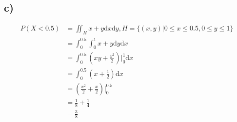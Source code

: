 \documentclass[a4paper, UTF-8]{article}
\theoremstyle{plain}
\begin{document}
\subsection{c)} 

\begin{align*}
P(X < 0.5) &= \iint_{H} x + y \mathrm{d}x \mathrm{d}y, H = \{(x, y) | 0 \leq x \leq 0.5, 0 \leq y \leq 1\}\\
&= \int_{0}^{0.5} \int_{0}^1 x + y \mathrm{d}y \mathrm{d}x\\
&= \int_{0}^{0.5} \left(xy + \frac{y^2}{2}\right) \Big|_{0}^1 \mathrm{d}x\\
&= \int_{0}^{0.5} \left(x + \frac{1}{2}\right) \mathrm{d}x\\
&= \left(\frac{x^2}{2} + \frac{x}{2}\right) \Big|_{0}^{0.5}\\
&= \frac{1}{8} + \frac{1}{4}\\
&= \frac{3}{8}
\end{align*}
\end{document}
